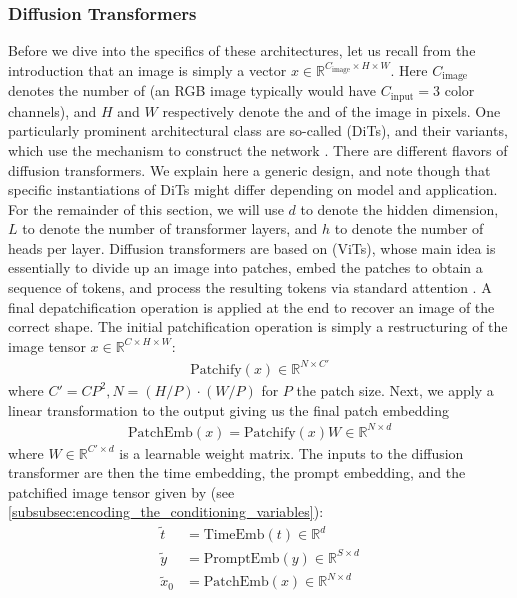 \subsubsection{Diffusion Transformers}
\label{subsec:transformers}
Before we dive into the specifics of these architectures, let us recall from the introduction that an image is simply a vector $x \in \mathbb{R}^{C_{\text{image}} \times H \times W}$. Here $C_{\text{image}}$ denotes the number of  (an RGB image typically would have $C_{\text{input}} = 3$ color channels), and $H$ and $W$ respectively denote the  and  of the image in pixels. One particularly prominent architectural class are so-called  (DiTs), and their variants, which use the  mechanism to construct the network \cite{attention, dit, ma2024sit}. There are different flavors of diffusion transformers. We explain here a generic design, and note though that specific instantiations of DiTs might differ depending on model and application. For the remainder of this section, we will use $d$ to denote the hidden dimension, $L$ to denote the number of transformer layers, and $h$ to denote the number of heads per layer. Diffusion transformers are based on  (ViTs), whose main idea is essentially to divide up an image into patches, embed the patches to obtain a sequence of tokens, and process the resulting tokens via standard attention \cite{vit}. A final depatchification operation is applied at the end to recover an image of the correct shape. The initial patchification operation is simply a restructuring of the image tensor $x\in \mathbb{R}^{C\times H\times W}$:
\begin{align*}
    \text{Patchify}(x)\in \mathbb{R}^{N\times C'}
\end{align*}
where $C'=CP^2, N=(H/P)\cdot(W/P)$ for $P$ the patch size. Next, we apply a linear transformation to the output giving us the final patch embedding
\begin{align*}
    \text{PatchEmb}(x)=\text{Patchify}(x)W \in \mathbb{R}^{N\times d}
\end{align*}
where $W\in \mathbb{R}^{C'\times d}$ is a learnable weight matrix. The inputs to the diffusion transformer are then the time embedding, the prompt embedding, and the patchified image tensor given by (see \cref{subsubsec:encoding_the_conditioning_variables}):
\begin{align*}
\tilde{t} &=\text{TimeEmb}(t)\in \mathbb{R}^{d}\\
\tilde{y}&=\text{PromptEmb}(y)\in\mathbb{R}^{S \times d}\\
\tilde{x}_{0}&=\text{PatchEmb}(x)\in\mathbb{R}^{N\times d}
\end{align*}
